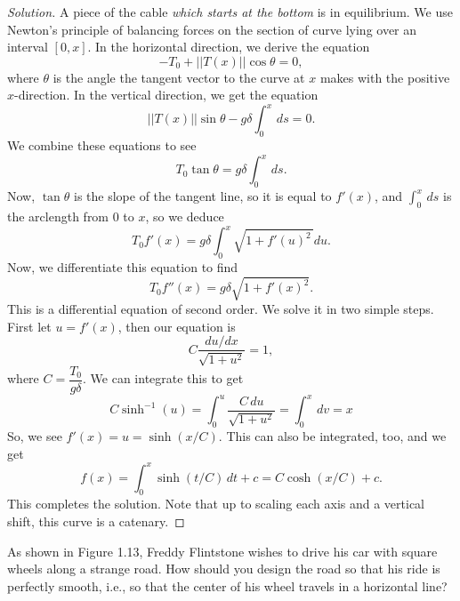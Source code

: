\documentclass[Shifrin_Solutions_Spring_2015]{subfiles}
\begin{document}
\begin{proof}[Solution]
A piece of the cable \emph{which starts at the bottom} is in equilibrium. We use Newton's principle of balancing forces on the section of curve lying over an interval $[0,x]$.
In the horizontal direction, we derive the equation
\[
-T_0 + ||T(x)||\cos\theta = 0 ,
\]
where $\theta$ is the angle the tangent vector to the curve at $x$ makes with the positive $x$-direction.
In the vertical direction, we get the equation
\[
||T(x)|| \sin\theta   - g\delta \int_0^x \, ds = 0 .
\]
We combine these equations to see
\[
T_0  \tan\theta  = g \delta \int_0^x \, ds .
\]
Now, $\tan\theta$ is the slope of the tangent line, so it is equal to $f'(x)$, and $\int_0^x \, ds$ is the arclength from $0$ to $x$, so we deduce
\[
T_0 f'(x) = g \delta \int_0^x \sqrt{ 1 + f'(u)^2\, } du .
\]
Now, we differentiate this equation to find
\[
T_0 f''(x) = g \delta \sqrt{1+ f'(x)^2 }.
\]
This is a differential equation of second order. We solve it in two simple steps. First let $u = f'(x)$, then our equation is
\[
C\dfrac{du/dx}{\sqrt{1+u^2 }}  = 1,
\]
where $C =  \dfrac{T_0}{g\delta}$.
We can integrate this to get
\[
C \sinh^{-1}(u) = \int_0^u \dfrac{C \, du}{\sqrt{1+u^2}} = \int_0^x \, dv = x
\]
So, we see $f'(x) = u = \sinh(x/C)$. This can also be integrated, too, and we get
\[
f(x) = \int_0^x \sinh(t/C) \, dt + c = C \cosh(x/C) + c .
\]
This completes the solution. Note that up to scaling each axis and a vertical shift, this curve is a catenary.
\end{proof}





\begin{exercise}
As shown in Figure 1.13, Freddy Flintstone wishes to drive his car with square wheels along a strange road. How should you design the road so that his ride is perfectly smooth, i.e., so that the center of his wheel travels in a horizontal line?
\end{exercise}
\end{document}
